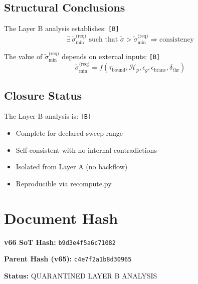 \documentclass[11pt,a4paper]{article}
\newcommand{\tagB}{\textcolor{purple!70!black}{\texttt{[B]}}}
\theoremstyle{definition}
\begin{document}
\subsection{Structural Conclusions}
\label{subsec:struct-conc}

The Layer B analysis establishes: \tagB{}
\begin{equation}
\label{eq:struct-conc}
\exists \, \tilde{\sigma}_{\min}^{\text{(req)}} \text{ such that } \tilde{\sigma} > \tilde{\sigma}_{\min}^{\text{(req)}} \Rightarrow \text{consistency}
\end{equation}

The value of $\tilde{\sigma}_{\min}^{\text{(req)}}$ depends on external inputs: \tagB{}
\begin{equation}
\label{eq:min-depends}
\tilde{\sigma}_{\min}^{\text{(req)}} = f(\tau_{\text{bound}}, \mathcal{H}_p, \epsilon_g, \epsilon_{\text{brane}}, \delta_{\text{thr}})
\end{equation}

\subsection{Closure Status}
\label{subsec:closure-status}

The Layer B analysis is: \tagB{}
\begin{itemize}
  \item Complete for declared sweep range
  \item Self-consistent with no internal contradictions
  \item Isolated from Layer A (no backflow)
  \item Reproducible via recompute.py
\end{itemize}

\section*{Document Hash}
\label{sec:hash}

\begin{statusbox}
\textbf{v66 SoT Hash:} \texttt{b9d3e4f5a6c71082}

\textbf{Parent Hash (v65):} \texttt{c4e7f2a1b8d30965}

\textbf{Status:} QUARANTINED LAYER B ANALYSIS
\end{statusbox}
\end{document}
